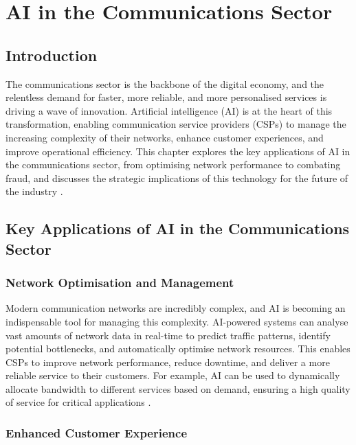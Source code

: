 \chapter{AI in the Communications Sector}
\label{cha:ai_in_communications}

\section{Introduction}

The communications sector is the backbone of the digital economy, and the relentless demand for faster, more reliable, and more personalised services is driving a wave of innovation. Artificial intelligence (AI) is at the heart of this transformation, enabling communication service providers (CSPs) to manage the increasing complexity of their networks, enhance customer experiences, and improve operational efficiency. This chapter explores the key applications of AI in the communications sector, from optimising network performance to combating fraud, and discusses the strategic implications of this technology for the future of the industry \parencite{wef2020impact}.

\section{Key Applications of AI in the Communications Sector}

\subsection{Network Optimisation and Management}

Modern communication networks are incredibly complex, and AI is becoming an indispensable tool for managing this complexity. AI-powered systems can analyse vast amounts of network data in real-time to predict traffic patterns, identify potential bottlenecks, and automatically optimise network resources. This enables CSPs to improve network performance, reduce downtime, and deliver a more reliable service to their customers. For example, AI can be used to dynamically allocate bandwidth to different services based on demand, ensuring a high quality of service for critical applications \parencite{kumar2019role}.

\subsection{Enhanced Customer Experience}

